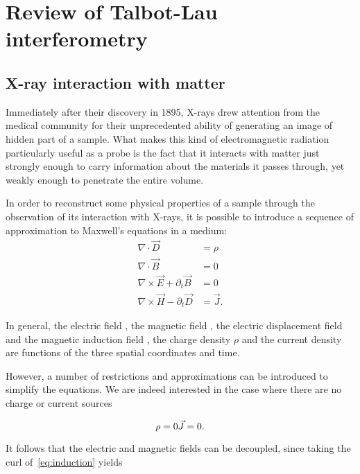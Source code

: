 \chapter{Review of Talbot-Lau interferometry}\label{ch:review}

\section{X-ray interaction with matter}

Immediately after their discovery in 1895, X-rays drew attention from the
medical community for their unprecedented ability of generating an image of
hidden part of a sample. What makes this kind of electromagnetic radiation
particularly useful as a probe is the fact that it interacts with matter
just strongly enough to carry information about the materials it passes
through, yet weakly enough to penetrate the entire volume.

In order to reconstruct some physical properties of a sample through the
observation of its interaction with X-rays, it is possible to introduce a
sequence of approximation to Maxwell's equations in a medium:
\begin{align}
    \nabla \cdot \vec{D} & = \rho \label{eq:gauss}\\
    \nabla \cdot \vec{B} & = 0 \label{eq:nomonopoles}\\
    \nabla \times \vec{E} + \partial_t \vec{B} & = 0
    \label{eq:induction}\\
    \nabla \times \vec{H} - \partial_t \vec{D} & = \vec{J}
    \label{eq:ampere}.
\end{align}

In general, the electric field , the magnetic field , the
electric displacement field  and the magnetic induction field
, the charge density $\rho$ and the current density  are
functions of the three spatial coordinates and time. 

However, a number of restrictions and approximations can be introduced to
simplify the equations. We are indeed interested in the case where there are
no charge or current sources

\begin{equation}
    \rho = 0\\
    \vec{J} = 0.
    \label{eq:absentsources}
\end{equation}

It follows that the electric and magnetic fields can be decoupled, since
taking the curl of~\eqref{eq:induction} yields

